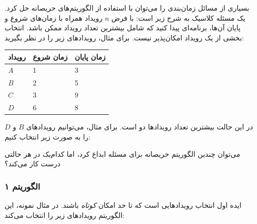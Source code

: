 بسیاری از مسائل زمان‌بندی را می‌توان
با استفاده از الگوریتم‌های حریصانه حل کرد.
یک مسئله کلاسیک به شرح زیر است:
با فرض $n$ رویداد همراه با زمان‌های شروع و پایان
آن‌ها، برنامه‌ای پیدا کنید
که شامل بیشترین تعداد رویداد ممکن باشد.
انتخاب بخشی از یک رویداد امکان‌پذیر نیست.
برای مثال، رویدادهای زیر را در نظر بگیرید:
\begin{center}
\begin{tabular}{lll}
رویداد & زمان شروع & زمان پایان \\
\hline
$A$ & 1 & 3 \\
$B$ & 2 & 5 \\
$C$ & 3 & 9 \\
$D$ & 6 & 8 \\
\end{tabular}
\end{center}
در این حالت بیشترین تعداد رویدادها دو است.
برای مثال، می‌توانیم رویدادهای $B$ و $D$ را
به صورت زیر انتخاب کنیم:
\begin{center}
\end{center}

می‌توان چندین الگوریتم حریصانه برای
مسئله ابداع کرد، اما کدام‌یک در هر حالتی درست کار می‌کند؟

\subsubsection*{الگوریتم ۱}

ایده اول انتخاب رویدادهایی است که تا حد امکان \emph{کوتاه}
باشند.
در مثال نمونه، این الگوریتم
رویدادهای زیر را انتخاب می‌کند:
\begin{center}
\end{center}

